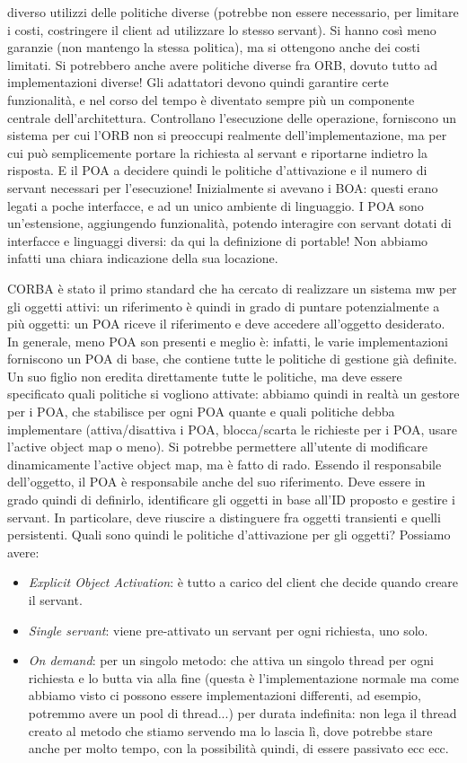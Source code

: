 diverso utilizzi delle politiche diverse (potrebbe non essere necessario, per limitare i costi, costringere il client ad
utilizzare lo stesso servant). Si hanno così meno garanzie (non mantengo la stessa politica), ma si ottengono anche dei
costi limitati. Si potrebbero anche avere politiche diverse fra ORB, dovuto tutto ad implementazioni diverse!
Gli adattatori devono quindi garantire certe funzionalità, e nel corso del tempo è diventato sempre più un componente
centrale dell'architettura. Controllano l'esecuzione delle operazione, forniscono un sistema per cui l'ORB non
si preoccupi realmente dell'implementazione, ma per cui può semplicemente portare la richiesta al servant e riportarne
indietro la risposta. E il POA a decidere quindi le politiche d'attivazione e il numero di servant necessari per
l'esecuzione!
Inizialmente si avevano i BOA: questi erano legati a poche interfacce, e ad un unico ambiente di linguaggio. I POA sono
un'estensione, aggiungendo funzionalità, potendo interagire con servant dotati di interfacce e linguaggi diversi: da
qui la definizione di portable! Non abbiamo infatti una chiara indicazione della sua locazione.

CORBA è stato il primo standard che ha cercato di realizzare un sistema mw per gli oggetti attivi: un riferimento è
quindi in grado di puntare potenzialmente a più oggetti: un POA riceve il riferimento e deve accedere all'oggetto
desiderato. In generale, meno POA son presenti e meglio è: infatti, le varie implementazioni forniscono un POA di base,
che contiene tutte le politiche di gestione già definite. Un suo figlio non eredita direttamente tutte le politiche, ma
deve essere specificato quali politiche si vogliono attivate: abbiamo quindi in realtà un gestore per i POA, che
stabilisce per ogni POA quante e quali politiche debba implementare (attiva/disattiva i POA, blocca/scarta le richieste per i POA, usare l'active object map o meno). Si potrebbe permettere all'utente di modificare dinamicamente l'active object map, ma è fatto di rado.
Essendo il responsabile dell'oggetto, il POA è responsabile anche del suo riferimento. Deve essere in grado quindi di
definirlo, identificare gli oggetti in base all'ID proposto e gestire i servant. In particolare, deve riuscire a
distinguere fra oggetti transienti e quelli persistenti.
Quali sono quindi le politiche d'attivazione per gli oggetti? Possiamo avere:
\begin{itemize}
 \item \textit{Explicit Object Activation}: è tutto a carico del client che decide quando creare il servant.
 \item \textit{Single servant}: viene pre-attivato un servant per ogni richiesta, uno solo.
 \item \textit{On demand}: per un singolo metodo: che attiva un singolo thread per ogni richiesta e lo butta via alla
fine (questa è l'implementazione normale ma come abbiamo visto ci possono essere implementazioni differenti, ad esempio, potremmo avere un pool di thread...)
per durata indefinita: non lega il thread creato al metodo che stiamo servendo ma lo lascia lì, dove potrebbe stare anche per molto tempo, con la possibilità quindi, di essere passivato ecc ecc.
\end{itemize}
